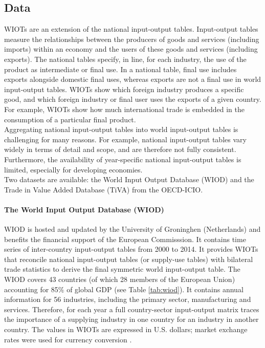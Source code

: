 \documentclass[11pt,a4paper]{article}
\begin{document}
\subsection{Data}
\label{subsec:data}

WIOTs are an extension of the national input-output tables. 
Input-output tables measure the relationships between the producers of goods and services (including imports) within an economy and the users of these goods and services (including exports). The national tables specify, in line, for each industry, the use of the product as intermediate or final use. 
In a national table, final use includes exports alongside domestic final uses, whereas exports are not a final use in world input-output tables. 
WIOTs show which foreign industry produces a specific good, and which foreign industry or final user uses the exports of a given country. 
For example, WIOTs show how much international trade is embedded in the consumption of a particular final product. \\
Aggregating national input-output tables into world input-output tables is challenging for many reasons. For example, national input-output tables vary widely in terms of detail and scope, and are therefore not fully consistent. Furthermore, the availability of year-specific national input-output tables is limited, especially for developing economies.  \\
Two datasets are available: the World Input Output Database (WIOD) and the Trade in Value Added Database (TiVA) from the OECD-ICIO.

\paragraph{The World Input Output Database (WIOD)}
WIOD is hosted and updated by the University of Groninghen (Netherlands) and benefits the financial support of the European Commisssion. It contains time series of inter-country input-output tables from 2000 to 2014. 
It provides WIOTs that reconcile national input-output tables (or supply-use tables) with bilateral trade statistics to derive the final symmetric world input-output table.
The WIOD covers 43 countries (of which 28 members of the European Union) accounting for 85$\%$ of global GDP (see Table \ref{tab:wiod}). 
It contains annual information for 56 industries, including the primary sector, manufacturing and services. Therefore, for each year a full country-sector input-output matrix traces the importance of a supplying industry in one country for an industry in another country. The values in WIOTs are expressed in U.S. dollars; market exchange rates were used for currency conversion \citep{Timmer2015}. 
\end{document}
